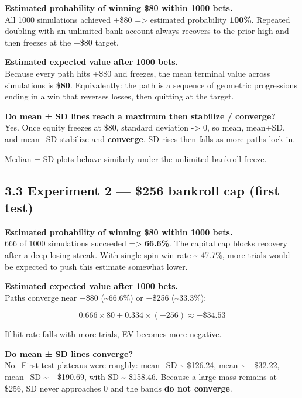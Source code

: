 \documentclass[
  11pt,
]{article}
\begin{document}
\textbf{Estimated probability of winning \$80 within 1000 bets.}\\
All 1000 simulations achieved +\$80 =\textgreater{} estimated
probability \textbf{100\%}. Repeated doubling with an unlimited bank
account always recovers to the prior high and then freezes at the +\$80
target.

\textbf{Estimated expected value after 1000 bets.}\\
Because every path hits +\$80 and freezes, the mean terminal value
across simulations is \textbf{\$80}. Equivalently: the path is a
sequence of geometric progressions ending in a win that reverses losses,
then quitting at the target.

\textbf{Do mean ± SD lines reach a maximum then stabilize / converge?}\\
Yes. Once equity freezes at \$80, standard deviation -\textgreater{} 0,
so mean, mean+SD, and mean−SD stabilize and \textbf{converge}. SD rises
then falls as more paths lock in.

Median ± SD plots behave similarly under the unlimited-bankroll freeze.

\subsection{3.3 Experiment 2 --- \$256 bankroll cap (first
test)}\label{experiment-2-256-bankroll-cap-first-test}

\textbf{Estimated probability of winning \$80 within 1000 bets.}\\
666 of 1000 simulations succeeded =\textgreater{} \textbf{66.6\%}. The
capital cap blocks recovery after a deep losing streak. With single-spin
win rate \textasciitilde{} 47.7\%, more trials would be expected to push
this estimate somewhat lower.

\textbf{Estimated expected value after 1000 bets.}\\
Paths converge near +\$80 (\textasciitilde66.6\%) or −\$256
(\textasciitilde33.3\%):

\[
0.666 \times 80 + 0.334 \times (-256) \approx -\$34.53
\]

If hit rate falls with more trials, EV becomes more negative.

\textbf{Do mean ± SD lines converge?}\\
No.~First-test plateaus were roughly: mean+SD \textasciitilde{}
\$126.24, mean \textasciitilde{} −\$32.22, mean−SD \textasciitilde{}
−\$190.69, with SD \textasciitilde{} \$158.46. Because a large mass
remains at −\$256, SD never approaches 0 and the bands \textbf{do not
converge}.
\end{document}
